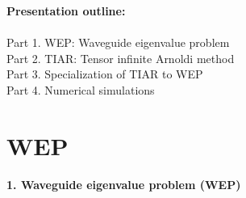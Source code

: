 \documentclass[10pt]{beamer}
\begin{document}
\begin{frame}
  \maketitle
\end{frame}
\begin{frame}

{\bf Presentation outline:}\\~\\
Part 1. WEP: Waveguide eigenvalue problem\\
Part 2. TIAR: Tensor infinite Arnoldi method\\
Part 3. Specialization of TIAR to WEP\\
Part 4. Numerical simulations
\end{frame}
\section{WEP}
\begin{frame}
\begin{center}
\Large
\bf 1. Waveguide eigenvalue problem (WEP)\\\vspace{0.5cm}
\end{center}
\end{frame}
\end{document}

